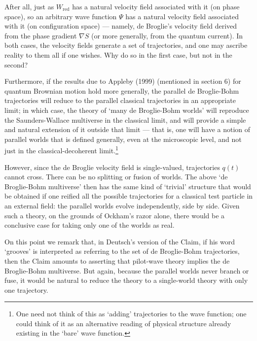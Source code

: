 \documentclass[12pt]{article}%
\begin{document}
After all, just as $W_{\mathrm{red}}$ has a natural velocity field associated
with it (on phase space), so an arbitrary wave function $\Psi$ has a natural
velocity field associated with it (on configuration space) --- namely, de
Broglie's velocity field derived from the phase gradient $\nabla S$ (or more
generally, from the quantum current). In both cases, the velocity fields
generate a set of trajectories, and one may ascribe reality to them all if one
wishes. Why do so in the first case, but not in the second?

Furthermore, if the results due to Appleby (1999) (mentioned in section 6) for
quantum Brownian motion hold more generally, the parallel de Broglie-Bohm
trajectories will reduce to the parallel classical trajectories in an
appropriate limit; in which case, the theory of `many de Broglie-Bohm worlds'
will reproduce the Saunders-Wallace multiverse in the classical limit, and
will provide a simple and natural extension of it outside that limit --- that
is, one will have a notion of parallel worlds that is defined generally, even
at the microscopic level, and not just in the classical-decoherent
limit.\footnote{One need not think of this as `adding' trajectories to the
wave function; one could think of it as an alternative reading of physical
structure already existing in the `bare' wave function.}

However, since the de Broglie velocity field is single-valued, trajectories
$q(t)$ cannot cross. There can be no splitting or fusion of worlds. The above
`de Broglie-Bohm multiverse' then has the same kind of `trivial' structure
that would be obtained if one reified all the possible trajectories for a
classical test particle in an external field: the parallel worlds evolve
independently, side by side. Given such a theory, on the grounds of Ockham's
razor alone, there would be a conclusive case for taking only one of the
worlds as real.

On this point we remark that, in Deutsch's version of the Claim, if his word
`grooves' is interpreted as referring to the set of de Broglie-Bohm
trajectories, then the Claim amounts to asserting that pilot-wave theory
implies the de Broglie-Bohm multiverse. But again, because the parallel worlds
never branch or fuse, it would be natural to reduce the theory to a
single-world theory with only one trajectory.
\end{document}
